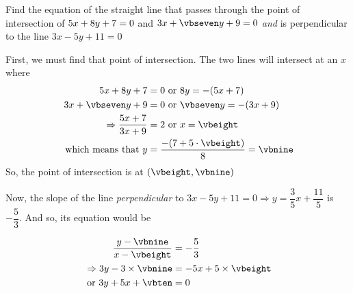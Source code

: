 \gcalcexpr[0]{\vbseven}{\vbtwo / \vbsix} %
\gcalcexpr[2]{\vbeight}{(\vbsix * \vbfive - \vbthree)/(\vbone - \vbsix * \vbfour)} %
\gcalcexpr[2]{\vbnine}{-(\vbthree + \vbone * \vbeight)/\vbtwo}

\question Find the equation of the straight line that passes through the point of intersection of 
$5 x + 8 y + 7 = 0$ and $\vbfour x + \vbseven y + \vbfive = 0$ \textit{and} is 
perpendicular to the line $3x-5y+11 = 0$

\insertQR{}

\watchout

\ifprintanswers
\fi 

\begin{solution}
	First, we must find that point of intersection. The two lines will intersect at an $x$ where
	\begin{align}
	    \vbone x + \vbtwo y + \vbthree &= 0 \text{ or } \vbtwo y = -(\vbone x + \vbthree) \\
	    \vbfour x + \vbseven y + \vbfive &= 0 \text { or } \vbseven y = -(\vbfour x + \vbfive) \\
	    \Rightarrow \dfrac{\vbone x + \vbthree}{\vbfour x + \vbfive} &= \vbsix \text{ or } x = \vbeight \\
	    \text{ which means that } y &= \dfrac{-(\vbthree + \vbone\cdot\vbeight)}{\vbtwo} = \vbnine
	\end{align}
	So, the point of intersection is at $(\vbeight, \vbnine)$
	
	Now, the slope of the line \textit{ perpendicular } to 
	$3x - 5y + 11 = 0 \Rightarrow y = \dfrac{3}{5}x + \dfrac{11}{5}$ is $-\dfrac{5}{3}$. And so, its equation
	would be 
	
	
	\begin{align}
		\dfrac{y - \vbnine}{x - \vbeight} &= -\dfrac{5}{3} \\
		\Rightarrow 3y - 3\times\vbnine &= -5x + 5\times\vbeight \\
		\text{ or } 3y + 5x + \vbten &= 0
	\end{align}
	
\end{solution}
